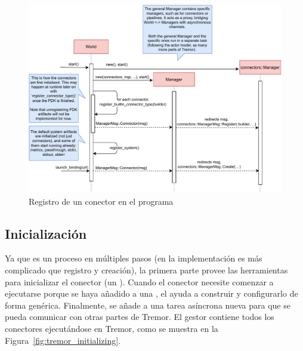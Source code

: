 \begin{figure}
    \centering
    \includegraphics[width=\textwidth]{./Imagenes/registering.pdf}
    \caption{Registro de un conector en el programa}%
    \label{fig:tremor_registering}
\end{figure}

\subsection{Inicialización}

Ya que es un proceso en múltiples pasos (en la implementación es más complicado
que registro y creación), la primera parte provee las herramientas para
inicializar el conector (un \builder). Cuando el conector necesite comenzar a
ejecutarse porque se haya añadido a una \pipeline, el \builder ayuda a construir
y configurarlo de forma genérica. Finalmente, se añade a una tarea asíncrona
nueva para que se pueda comunicar con otras partes de Tremor. El gestor
 contiene todos los conectores ejecutándose en Tremor,
como se muestra en la Figura~\ref{fig:tremor_initializing}.

